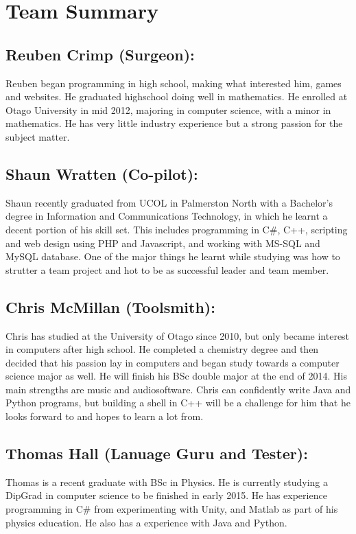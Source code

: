 \documentclass[a4paper,11pt]{article}
\begin{document}
\section{Team Summary}

\subsection*{Reuben Crimp (Surgeon):}
Reuben began programming in high school, making what interested him, games and websites. He graduated highschool doing well in mathematics. He enrolled at Otago University in mid 2012, majoring in computer science, with a minor in mathematics. He has very little industry experience but a strong passion for the subject matter.

\subsection*{Shaun Wratten (Co-pilot):}
Shaun recently graduated from UCOL in Palmerston North with a Bachelor’s degree in Information and Communications Technology, in which he learnt a decent portion of his skill set. This includes programming in C\#, C++, scripting and web design using PHP and Javascript, and working with MS-SQL and MySQL database. One of the major things he learnt while studying was how to strutter a team project and hot to be as successful leader and team member.

\subsection*{Chris McMillan (Toolsmith):}
Chris has studied at the University of Otago since 2010, but only became interest in computers after high school. He completed a chemistry degree and then decided that his passion lay in computers and began study towards a computer science major as well. He will finish his BSc double major at the end of 2014. His main strengths are music and audiosoftware. Chris can confidently write Java and Python programs, but building a shell in C++ will be a challenge for him that he looks forward to and hopes to learn a lot from.

\subsection*{Thomas Hall (Lanuage Guru and Tester):}
Thomas is a recent graduate with BSc in Physics. He is currently studying a DipGrad in computer science to be finished in early 2015. He has experience programming in C\# from experimenting with Unity, and Matlab as part of his physics education. He also has a experience with Java and Python.
\end{document}
